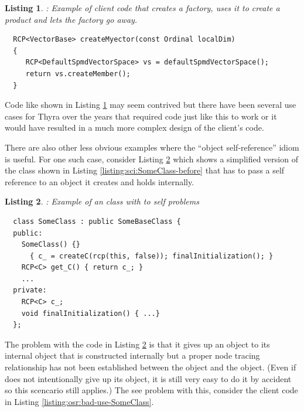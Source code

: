 \documentclass[pdf,ps2pdf,11pt]{SANDreport}
\newtheorem{listing}{Listing}
\begin{document}
\begin{listing}: Example of client code that creates a factory, uses it to
create a product and lets the factory go away.  \\
\label{listing:osr:DefaultSpmdVectorSpace-use-delete}
{\small\begin{verbatim}
  RCP<VectorBase> createMyector(const Ordinal localDim)
  {
     RCP<DefaultSpmdVectorSpace> vs = defaultSpmdVectorSpace();
     return vs.createMember();
  }
\end{verbatim}}
\end{listing}


Code like shown in Listing
{}\ref{listing:osr:DefaultSpmdVectorSpace-use-delete} may seem
contrived but there have been several use cases for Thyra over the
years that required code just like this to work or it would have
resulted in a much more complex design of the client's code.

There are also other less obvious examples where the ``object
self-reference'' idiom is useful.  For one such case, consider Listing
{}\ref{listing:osr:SomeClass-before} which shows a simplified version
of the class shown in Listing {}\ref{listing:sci:SomeClass-before}
that has to pass a self reference to an object it creates and holds
internally.


\begin{listing}: Example of an class with {} to self problems  \\
\label{listing:osr:SomeClass-before}
{\small\begin{verbatim}
  class SomeClass : public SomeBaseClass {
  public:
    SomeClass() {}
      { c_ = createC(rcp(this, false)); finalInitialization(); }
    RCP<C> get_C() { return c_; }
    ...
  private:
    RCP<C> c_;
    void finalInitialization() { ...}
  };
\end{verbatim}}
\end{listing}


The problem with the code in Listing
{}\ref{listing:osr:SomeClass-before} is that it gives up an
{} object to its internal {} object that is
constructed internally but a proper node tracing relationship has not
been established between the {} object and the
{} object.  (Even if {} does not
intentionally give up its {} object, it is still very
easy to do it by accident so this scencario still applies.)  The see
problem with this, consider the client code in Listing
{}\ref{listing:osr:bad-use-SomeClass}.
\end{document}
